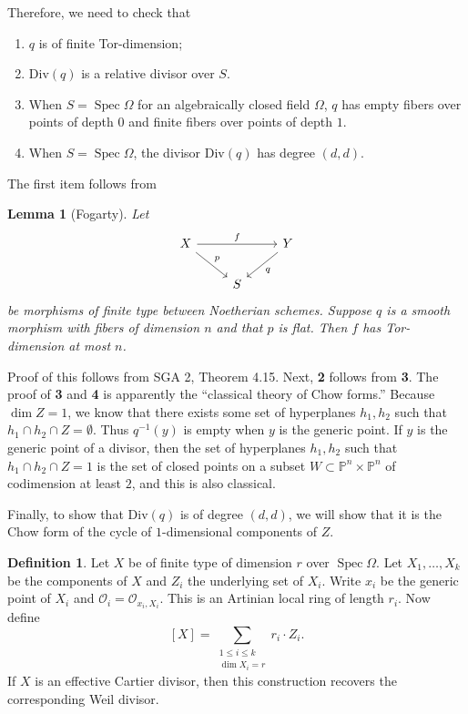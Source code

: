 \documentclass[leqno, openany]{memoir}
\newtheorem{lem}[thm]{Lemma}
\theoremstyle{definition}
\newtheorem{defn}[thm]{Definition}
\theoremstyle{remark}
\theoremstyle{plain}
\theoremstyle{definition}
\theoremstyle{remark}
\renewcommand{\P}{\mathbb{P}}
\newcommand{\mc}[1]{\mathcal{#1}}
\newcommand{\mr}[1]{\mathrm{#1}}
\DeclareMathOperator{\Spec}{Spec}
\begin{document}
Therefore, we need to check that \begin{enumerate} \item $q$ is of finite
    Tor-dimension; \item $\mr{Div}(q)$ is a relative divisor over $S$.  \item
    When $S = \Spec \Omega$ for an algebraically closed field $\Omega$, $q$ has
    empty fibers over points of depth $0$ and finite fibers over points of
    depth $1$.  \item When $S = \Spec \Omega$, the divisor $\mr{Div}(q)$ has
degree $(d,d)$.  \end{enumerate} The first item follows from
        \begin{lem}[Fogarty] Let \begin{equation*} \begin{tikzcd} X
            \arrow{rr}{f} \arrow{dr}{p} & & Y \arrow{dl}{q} \\ & S \end{tikzcd}
    \end{equation*} be morphisms of finite type between Noetherian schemes.
    Suppose $q$ is a smooth morphism with fibers of dimension $n$ and that $p$
    is flat. Then $f$ has Tor-dimension at most $n$.  \end{lem} Proof of this
    follows from SGA 2, Theorem 4.15. Next, \textbf{2} follows from \textbf{3}.
    The proof of \textbf{3} and \textbf{4} is apparently the ``classical theory
    of Chow forms.'' Because $\dim Z = 1$, we know that there exists some set
    of hyperplanes $h_1, h_2$ such that $h_1 \cap h_2 \cap Z = \emptyset$. Thus
    $q^{-1}(y)$ is empty when $y$ is the generic point. If $y$ is the generic
    point of a divisor, then the set of hyperplanes $h_1, h_2$ such that $h_1
    \cap h_2 \cap Z = 1$ is the set of closed points on a subset $W \subset
    \P^n \times \P^n$ of codimension at least $2$, and this is also classical.

Finally, to show that $\mr{Div}(q)$ is of degree $(d,d)$, we will show that it
is the Chow form of the cycle of $1$-dimensional components of $Z$.
\begin{defn} Let $X$ be of finite type of dimension $r$ over $\Spec \Omega$.
    Let $X_1, \ldots, X_k$ be the components of $X$ and $Z_i$ the underlying
    set of $X_i$. Write $x_i$ be the generic point of $X_i$ and $\mc{O}_i =
    \mc{O}_{x_i, X_i}$. This is an Artinian local ring of length $r_i$. Now
    define \[ [X] = \sum_{\substack{1 \leq i \leq k \\ \dim X_i = r}} r_i \cdot
    Z_i. \] If $X$ is an effective Cartier divisor, then this construction
recovers the corresponding Weil divisor.  \end{defn}
\end{document}
